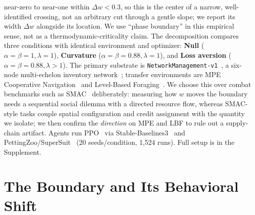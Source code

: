 \documentclass[letterpaper]{article} %
\theoremstyle{plain}
\begin{document}
near-zero to near-one within $\Delta w<0.3$, so this is the center of a narrow, well-identified
crossing, not an arbitrary cut through a gentle slope; we report its width $\Delta w$ alongside its
location. We use ``phase boundary'' in this empirical sense, not as a thermodynamic-criticality
claim. The decomposition compares three
conditions with identical environment and optimizer: \textbf{Null} ($\alpha{=}\beta{=}1,
\lambda{=}1$), \textbf{Curvature} ($\alpha{=}\beta{=}0.88,\lambda{=}1$), and \textbf{Loss
aversion} ($\alpha{=}\beta{=}0.88,\lambda>1$). The primary substrate is
\texttt{NetworkManagement-v1}~\citep{hubbs2020orgym}, a six-node multi-echelon inventory
network~\citep{oroojlooyjadid2022,gijsbrechts2022,marlim2023}; transfer environments are MPE
Cooperative Navigation~\citep{lowe2017multi} and Level-Based Foraging~\citep{christianos2020shared}.
We choose this over combat benchmarks such as SMAC~\citep{samvelyan2019smac} deliberately: measuring
how $w$ moves the boundary needs a sequential social dilemma with a directed resource flow, whereas
SMAC-style tasks couple spatial configuration and credit assignment with the quantity we isolate; we
then confirm the \emph{direction} on MPE and LBF to rule out a supply-chain artifact. Agents run
PPO~\citep{schulman2017ppo} via Stable-Baselines3~\citep{raffin2021sb3} and
PettingZoo/SuperSuit~\citep{terry2021pettingzoo,terry2020supersuit} (20 seeds/condition, 1{,}524
runs). Full setup is in the Supplement.

\section{The Boundary and Its Behavioral Shift}
\label{sec:results}
\end{document}
